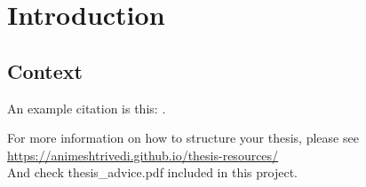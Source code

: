 

\chapter{Introduction}

\ifpdf
    \graphicspath{{1_introduction/figures/PNG/}{1_introduction/figures/PDF/}{1_introduction/figures/}}
\else
    \graphicspath{{1_introduction/figures/EPS/}{1_introduction/figures/}}
\fi







\section{Context} 
An example citation is this: \cite{JSScondori2018}.

\noindent For more information on how to structure your thesis, please see \\ \url{https://animeshtrivedi.github.io/thesis-resources/} \\
\noindent And check thesis\_advice.pdf included in this project.


